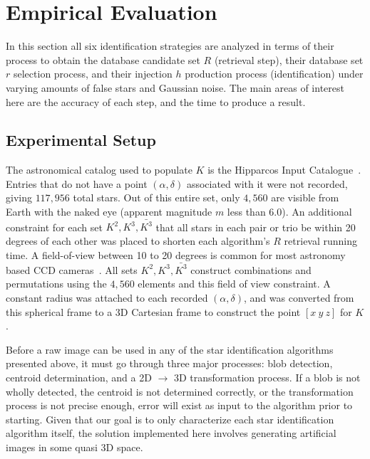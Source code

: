 \newcommand{\AVG}{\mathit{AVG}}

\section{Empirical Evaluation}\label{sec:empiricalEvaluation}
In this section all six identification strategies are analyzed in terms of their process to obtain the database
candidate set $R$ (retrieval step), their database set $r$ selection process, and their injection $h$ production process
(identification) under varying amounts of false stars and Gaussian noise.
The main areas of interest here are the accuracy of each step, and the time to produce a result.


\subsection{Experimental Setup}\label{subsec:experimentalSetup}
The astronomical catalog used to populate $K$ is the Hipparcos Input
Catalogue~\cite{perryman:hipparcosCatalogue}.
Entries that do not have a point $\left( \alpha, \delta \right)$ associated with it were not recorded, giving
$117{,}956$ total stars.
Out of this entire set, only $4{,}560$ are visible from Earth with the naked eye (apparent magnitude $m$ less than 6.0).
An additional constraint for each set $K^2, K^3, \bar{K^3}$ that all stars in each pair or trio be within 20
degrees of each other was placed to shorten each algorithm's $R$ retrieval running time.
A field-of-view between 10 to 20 degrees is common for most astronomy based CCD
cameras~\cite{mortari:pyramidIdentification}.
All sets $K^2, K^3, \bar{K^3}$ construct combinations and permutations using the $4{,}560$ elements and this field
of view constraint.
A constant radius was attached to each recorded $\left(\alpha, \delta \right)$, and was converted from this spherical
frame to a 3D Cartesian frame to construct the point $[ x \ y \ z ]$ for $K$.

Before a raw image can be used in any of the star identification algorithms presented above, it must go through
three major processes: blob detection, centroid determination, and a 2D $\rightarrow$ 3D transformation process.
If a blob is not wholly detected, the centroid is not determined correctly, or the transformation process
is not precise enough, error will exist as input to the algorithm prior to starting.
Given that our goal is to only characterize each star identification algorithm itself, the solution implemented here
involves generating artificial images in some quasi 3D space.


